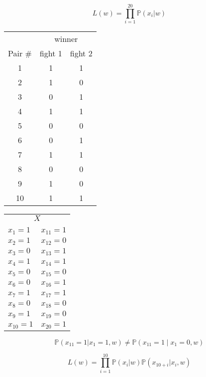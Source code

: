 \documentclass[landscape]{foils}
\renewcommand{\Pr}{\mathbb{P}}
\begin{document}
$$L(w) = \prod_{i=1}^{20} \Pr(x_i|w)$$


\myNewSlide
\begin{center}
\begin{tabular}{|c|c|c|}
\hline
& \multicolumn{2}{c|}{winner}\\
Pair \# & fight 1 & fight 2 \\
\hline
1 & 1 & 1  \\
\hline
2 & 1 & 0  \\
\hline
3 & 0 & 1  \\
\hline
4 & 1 & 1  \\
\hline
5 & 0 & 0  \\
\hline
6 & 0 & 1   \\
\hline
7 & 1 & 1  \\
\hline
8 & 0 & 0  \\
\hline
9 & 1 & 0  \\
\hline
10 & 1 & 1   \\
\hline
\end{tabular}
\begin{tabular}{ll}
\multicolumn{2}{c}{$X$}\\
\\
$x_1 = 1$ & $x_{11} = 1$  \\
$x_2 = 1$ & $x_{12} = 0$  \\
$x_3 = 0$ & $x_{13} = 1$  \\
$x_4 = 1$ & $x_{14} = 1$  \\
$x_5 = 0$ & $x_{15} = 0$  \\
$x_6 = 0$ & $x_{16} = 1$  \\
$x_7 = 1$ & $x_{17} = 1$  \\
$x_8 = 0$ & $x_{18} = 0$  \\
$x_9 = 1$ & $x_{19} = 0$  \\
$x_{10} = 1$ & $x_{20} = 1$  \\
\end{tabular}
\end{center}

$$\Pr(x_{11} = 1 | x_{1} = 1, w) \neq \Pr(x_{11} = 1 \mid x_{1} = 0, w)$$

$$L(w) = \prod_{i=1}^{10} \Pr(x_i|w)\Pr(x_{10+i}|x_{i}, w)$$
\end{document}
